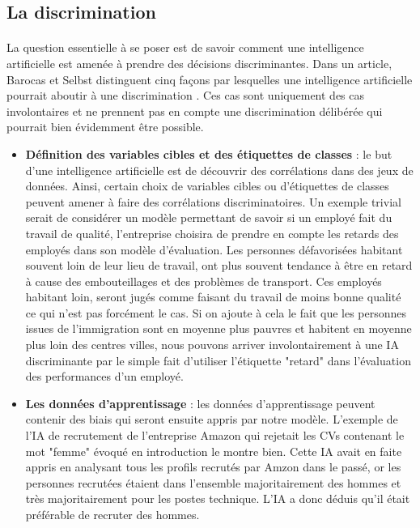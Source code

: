 \subsection{La discrimination}
\paragraph{}La question essentielle à se poser est de savoir comment une intelligence artificielle est amenée à prendre des décisions discriminantes. Dans un article, Barocas et Selbst distinguent cinq façons par lesquelles une intelligence artificielle pourrait aboutir à une discrimination \cite{discriminationWay}. Ces cas sont uniquement des cas involontaires et ne prennent pas en compte une discrimination délibérée qui pourrait bien évidemment être possible.
\begin{itemize}
    \item \textbf{Définition des variables cibles et des étiquettes de classes} : le but d'une intelligence artificielle est de découvrir des corrélations dans des jeux de données. Ainsi, certain choix de variables cibles ou d'étiquettes de classes peuvent amener à faire des corrélations discriminatoires. Un exemple trivial serait de considérer un modèle permettant de savoir si un employé fait du travail de qualité, l'entreprise choisira de prendre en compte les retards des employés dans son modèle d'évaluation. Les personnes défavorisées habitant souvent loin de leur lieu de travail, ont plus souvent tendance à être en retard à cause des embouteillages et des problèmes de transport. Ces employés habitant loin, seront jugés comme faisant du travail de moins bonne qualité ce qui n'est pas forcément le cas. Si on ajoute à cela le fait que les personnes issues de l'immigration sont en moyenne plus pauvres et habitent en moyenne plus loin des centres villes, nous pouvons arriver involontairement à une IA discriminante par le simple fait d'utiliser l'étiquette "retard" dans l'évaluation des performances d'un employé.
    \item \textbf{Les données d'apprentissage} : les données d'apprentissage peuvent contenir des biais qui seront ensuite appris par notre modèle. L'exemple de l'IA de recrutement de l'entreprise Amazon qui rejetait les CVs contenant le mot "femme"\cite{amazonAi} évoqué en introduction le montre bien. Cette IA avait en faite appris en analysant tous les profils recrutés par Amzon dans le passé, or les personnes recrutées étaient dans l'ensemble majoritairement des hommes et très majoritairement pour les postes technique. L'IA a donc déduis qu'il était préférable de recruter des hommes.

\end{itemize}
